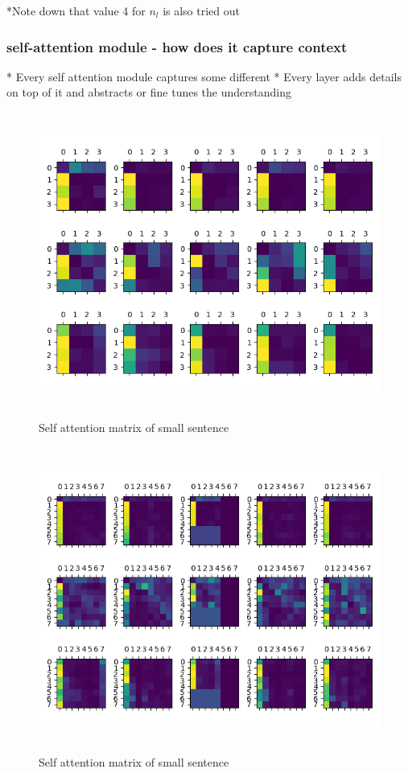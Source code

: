 \documentclass[a4paper, 11pt]{article}
\begin{document}
*Note down that value 4 for $n_l$ is also tried out

\subsubsection{self-attention module - how does it capture context }

* Every self attention module captures some different
* Every layer adds details on top of it and abstracts or fine tunes the understanding
\begin{figure}[htpb]
    \centering
    \includegraphics[width=\textwidth,height=10cm,keepaspectratio=true]
    {self-attention-matrix-1.png}
    \caption{
        Self attention matrix of small sentence
    }
    \label{fig:ff}
\end{figure}


\begin{figure}[htpb]
    \centering
    \includegraphics[width=\textwidth,height=10cm,keepaspectratio=true]
    {self-attention-matrix-2.png}
    \caption{
        Self attention matrix of small sentence
    }
    \label{fig:ff}
\end{figure}
\end{document}
